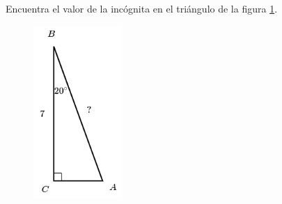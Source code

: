 \question[15]  Encuentra el valor de la incógnita en el triángulo de la figura \ref{fig:lados_functrig_18}.
\begin{figure}[H]
    \begin{center}
        \includegraphics[width=0.3\textwidth]{../images/lados_functrig_18.png}
    \end{center}
    \caption{}
    \label{fig:lados_functrig_18}
\end{figure}